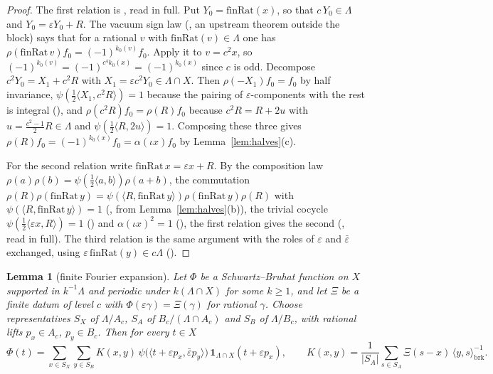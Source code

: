 \documentclass[11pt]{article}
\newtheorem{lemma}[theorem]{Lemma}
\theoremstyle{remark}
\begin{document}
\begin{proof}
The first relation is , read in full. Put $Y_0=\mathrm{finRat}(x)$, so that $c\,Y_0\in\Lambda$ and $Y_0=\varepsilon Y_0+R$. The vacuum sign law (, an upstream theorem outside the block) says that for a rational $v$ with $\mathrm{finRat}(v)\in\Lambda$ one has $\rho(\mathrm{finRat}\,v)f_0=(-1)^{k_0(v)}f_0$. Apply it to $v=c^2x$, so $(-1)^{k_0(v)}=(-1)^{c^4k_0(x)}=(-1)^{k_0(x)}$ since $c$ is odd. Decompose $c^2Y_0=X_1+c^2R$ with $X_1=\varepsilon c^2Y_0\in\Lambda\cap X$. Then $\rho(-X_1)f_0=f_0$ by half invariance, $\psi(\frac12\langle X_1,c^2R\rangle)=1$ because the pairing of $\varepsilon$-components with the rest is integral (), and $\rho(c^2R)f_0=\rho(R)f_0$ because $c^2R=R+2u$ with $u=\tfrac{c^2-1}2R\in\Lambda$ and $\psi(\frac12\langle R,2u\rangle)=1$. Composing these three gives $\rho(R)f_0=(-1)^{k_0(x)}f_0=\alpha(\iota x)f_0$ by Lemma~\ref{lem:halves}(c).

For the second relation write $\mathrm{finRat}\,x=\varepsilon x+R$. By the composition law $\rho(a)\rho(b)=\psi(\tfrac12\langle a,b\rangle)\rho(a+b)$, the commutation $\rho(R)\rho(\mathrm{finRat}\,y)=\psi(\langle R,\mathrm{finRat}\,y\rangle)\rho(\mathrm{finRat}\,y)\rho(R)$ with $\psi(\langle R,\mathrm{finRat}\,y\rangle)=1$ (, from Lemma~\ref{lem:halves}(b)), the trivial cocycle $\psi(\frac12\langle\varepsilon x,R\rangle)=1$ () and $\alpha(\iota x)^2=1$ (), the first relation gives the second (, read in full). The third relation is the same argument with the roles of $\varepsilon$ and $\bar\varepsilon$ exchanged, using $\varepsilon\,\mathrm{finRat}(y)\in c\Lambda$ ().
\end{proof}

\begin{lemma}[finite Fourier expansion]\label{lem:four}
Let $\Phi$ be a Schwartz--Bruhat function on $X$ supported in $k^{-1}\Lambda$ and periodic under $k(\Lambda\cap X)$ for some $k\ge1$, and let $\Xi$ be a finite datum of level $c$ with $\Phi(\varepsilon\gamma)=\Xi(\gamma)$ for rational $\gamma$. Choose representatives $S_X$ of $\Lambda/A_c$, $S_A$ of $B_c/(\Lambda\cap A_c)$ and $S_B$ of $\Lambda/B_c$, with rational lifts $p_x\in A_c$, $p_y\in B_c$. Then for every $t\in X$
\[
\Phi(t)=\sum_{x\in S_X}\sum_{y\in S_B}K(x,y)\,\psi\bigl(\langle t+\varepsilon p_x,\bar\varepsilon p_y\rangle\bigr)\,\mathbf 1_{\Lambda\cap X}(t+\varepsilon p_x),
\qquad K(x,y)=\frac1{\lvert S_A\rvert}\sum_{s\in S_A}\Xi(s-x)\,\langle y,s\rangle_{\mathrm{brk}}^{-1}.
\]
\end{lemma}
\end{document}
